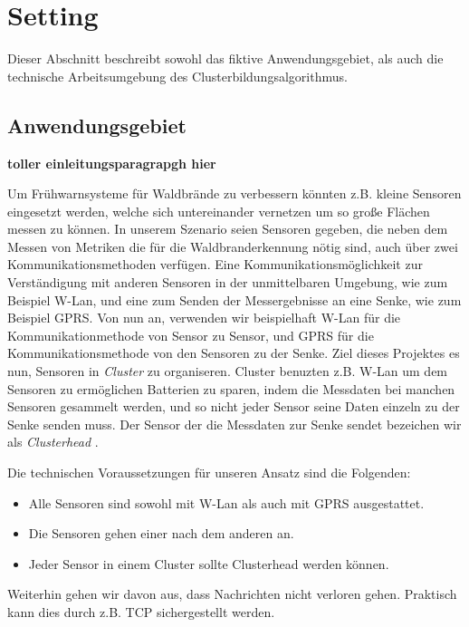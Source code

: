 \section{Setting}
Dieser Abschnitt beschreibt sowohl das fiktive Anwendungsgebiet, als auch die technische Arbeitsumgebung des Clusterbildungsalgorithmus.



\subsection{Anwendungsgebiet}
\textbf{toller einleitungsparagrapgh hier}

Um Fr\"uhwarnsysteme f\"ur Waldbr\"ande zu verbessern k\"onnten z.B. kleine Sensoren eingesetzt werden, welche sich untereinander vernetzen um so gro\ss e Fl\"achen messen zu k\"onnen.
In unserem Szenario seien Sensoren gegeben, die neben dem Messen von Metriken die f\"ur die Waldbranderkennung n\"otig sind, auch \"uber zwei Kommunikationsmethoden verf\"ugen. Eine Kommunikationsm\"oglichkeit zur Verst\"andigung mit anderen Sensoren in der unmittelbaren Umgebung, wie zum Beispiel W-Lan, und eine zum Senden der Messergebnisse an eine Senke, wie zum Beispiel GPRS.
Von nun an, verwenden wir beispielhaft W-Lan f\"ur die Kommunikationmethode von Sensor zu Sensor, und GPRS f\"ur die Kommunikationsmethode von den Sensoren zu der Senke.
Ziel dieses Projektes es nun, Sensoren in \emph{Cluster} zu organiseren.
Cluster benuzten z.B. W-Lan um dem Sensoren zu erm\"oglichen Batterien zu sparen, indem die Messdaten bei manchen Sensoren gesammelt werden, und so nicht jeder Sensor seine Daten einzeln zu der Senke senden muss.
Der Sensor der die Messdaten zur Senke sendet bezeichen wir als \emph{Clusterhead} .

Die technischen Voraussetzungen f\"ur unseren Ansatz sind die Folgenden:
\begin{itemize}
\item Alle Sensoren sind sowohl mit W-Lan als auch mit GPRS ausgestattet.
\item Die Sensoren gehen einer nach dem anderen an.
\item Jeder Sensor in einem Cluster sollte Clusterhead werden k\"onnen.
\end{itemize}

Weiterhin gehen wir davon aus, dass Nachrichten nicht verloren gehen.
Praktisch kann dies durch z.B. TCP sichergestellt werden.
